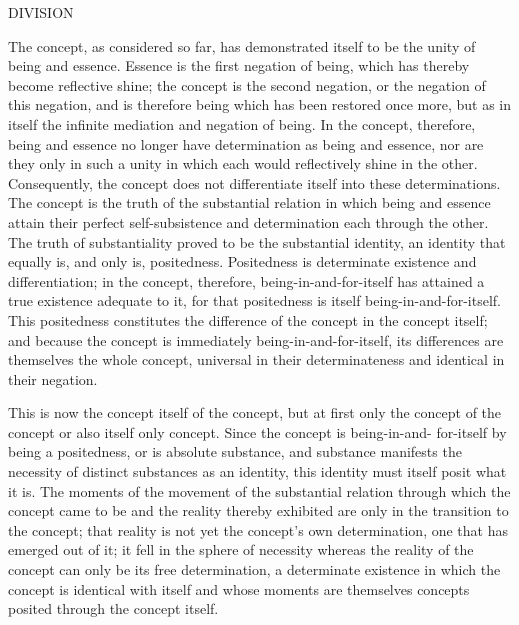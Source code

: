 DIVISION

The concept, as considered so far,
has demonstrated itself to be
the unity of being and essence.
Essence is the first negation of being,
which has thereby become reflective shine;
the concept is the second negation,
or the negation of this negation,
and is therefore being
which has been restored once more, but as in itself
the infinite mediation and negation of being.
In the concept, therefore, being and essence
no longer have determination as being and essence,
nor are they only in such a unity in which
each would reflectively shine in the other.
Consequently, the concept does not differentiate
itself into these determinations.
The concept is the truth of the substantial relation
in which being and essence attain their perfect
self-subsistence and determination each through the other.
The truth of substantiality proved to be the substantial identity,
an identity that equally is, and only is, positedness.
Positedness is determinate existence and differentiation;
in the concept, therefore, being-in-and-for-itself
has attained a true existence adequate to it,
for that positedness is itself being-in-and-for-itself.
This positedness constitutes the difference
of the concept in the concept itself;
and because the concept is immediately being-in-and-for-itself,
its differences are themselves the whole concept,
universal in their determinateness
and identical in their negation.

This is now the concept itself of the concept,
but at first only the concept
of the concept or also itself only concept.
Since the concept is being-in-and-
for-itself
 by being a positedness, or is absolute substance,
  and substance
manifests the necessity of distinct substances as an identity,
this identity must
itself posit what it is.
The moments of the movement of the substantial
relation through which the concept came to be and the reality thereby
exhibited are only in the transition to the concept;
that reality is not yet the
concept’s own determination,
one that has emerged out of it;
it fell in the
sphere of necessity whereas the reality of the concept can only be its free
determination, a determinate existence in which the concept is identical
with itself
and whose moments are themselves concepts posited through the
concept itself.

